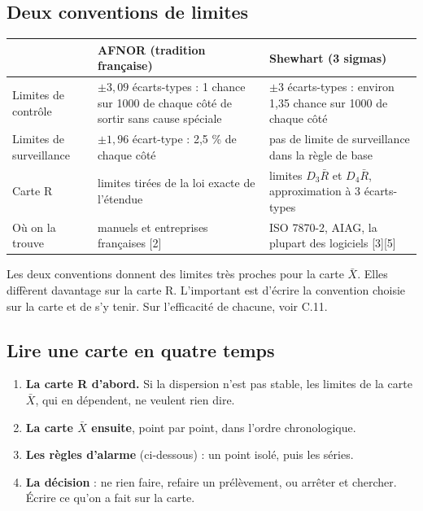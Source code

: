 \documentclass[11pt,a4paper]{article}
\newcommand{\Rb}{\bar{R}}
\begin{document}
\subsection{Deux conventions de limites}
\begin{center}\small
\begin{tabularx}{\textwidth}{@{}lXX@{}}\toprule
 & \textbf{AFNOR (tradition française)} & \textbf{Shewhart (3 sigmas)}\\\midrule
Limites de contrôle & $\pm3{,}09$ écarts-types : 1 chance sur \num{1000} de chaque côté de sortir sans cause spéciale & $\pm3$ écarts-types : environ 1,35 chance sur \num{1000} de chaque côté\\
Limites de surveillance & $\pm1{,}96$ écart-type : 2,5 \% de chaque côté & pas de limite de surveillance dans la règle de base\\
Carte R & limites tirées de la loi exacte de l'étendue & limites $D_3\Rb$ et $D_4\Rb$, approximation à 3 écarts-types\\
Où on la trouve & manuels et entreprises françaises [2] & ISO 7870-2, AIAG, la plupart des logiciels [3][5]\\\bottomrule
\end{tabularx}
\end{center}
Les deux conventions donnent des limites très proches pour la carte $\bar X$. Elles diffèrent davantage sur la carte R. L'important est d'écrire la convention choisie sur la carte et de s'y tenir. Sur l'efficacité de chacune, voir C.11.

\subsection{Lire une carte en quatre temps}
\begin{enumerate}[nosep]
\item \textbf{La carte R d'abord.} Si la dispersion n'est pas stable, les limites de la carte $\bar X$, qui en dépendent, ne veulent rien dire.
\item \textbf{La carte $\bar X$ ensuite}, point par point, dans l'ordre chronologique.
\item \textbf{Les règles d'alarme} (ci-dessous) : un point isolé, puis les séries.
\item \textbf{La décision} : ne rien faire, refaire un prélèvement, ou arrêter et chercher. Écrire ce qu'on a fait sur la carte.
\end{enumerate}
\end{document}
